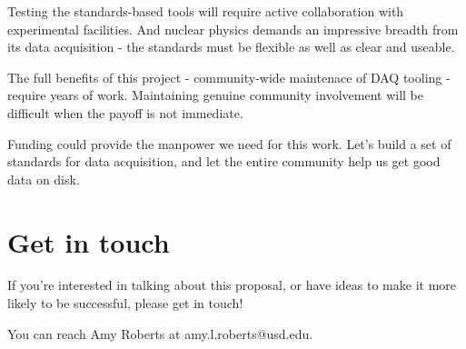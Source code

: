 \documentclass[]{report}   %
\begin{document}
Testing the standards-based tools will require active collaboration with experimental facilities.  And nuclear physics demands an impressive breadth from its data acquisition - the standards must be flexible as well as clear and useable.

The full benefits of this project - community-wide maintenace of DAQ tooling - require years of work.  Maintaining genuine community involvement will be difficult when the payoff is not immediate.

Funding could provide the manpower we need for this work.  Let's build a set of standards for data acquisition, and let the entire community help us get good data on disk.

\section*{Get in touch}
If you're interested in talking about this proposal, or have ideas to make it more likely to be successful, please get in touch!

You can reach Amy Roberts at amy.l.roberts@usd.edu.
\end{document}

